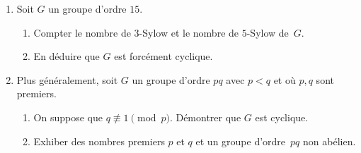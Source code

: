 \documentclass[./main]{subfiles}
\begin{document}
  \begin{enonce}
    \begin{enumerate}
      \item Soit $G$ un groupe d'ordre $15$.
        \begin{enumerate}
          \item Compter le nombre de $3$-Sylow et le nombre de $5$-Sylow de~$G$.
          \item En déduire que $G$ est forcément cyclique.
        \end{enumerate}
      \item Plus généralement, soit $G$ un groupe d'ordre $pq$ avec $p<q$ et où $p,q$ sont premiers.
        \begin{enumerate}
          \item On suppose que $q \not\equiv 1 \pmod p$. Démontrer que $G$ est cyclique.
          \item Exhiber des nombres premiers $p$ et $q$ et un groupe d'ordre~$pq$ non abélien.
        \end{enumerate}
    \end{enumerate}
  \end{enonce}
\end{document}
